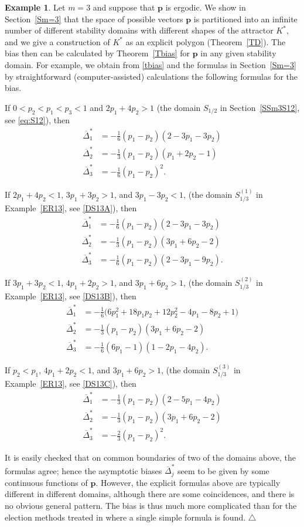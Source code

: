 \documentclass[11pt,reqno,tbtags,a4paper]{amsart}
\numberwithin{equation}{section}
\theoremstyle{plain}%
\theoremstyle{definition}
\newcommand\xqed[1]{%
    \leavevmode\unskip\penalty9999 \hbox{}\nobreak\hfill
    \quad\hbox{#1}}
\newtheorem{exampleqqq}[theorem]{Example}
\newenvironment{example}{\begin{exampleqqq}}
  {\xqed{$\triangle$}\end{exampleqqq}}
\theoremstyle{remark}
\newcommand{\refT}[1]{Theorem~\ref{#1}}
\newcommand{\refS}[1]{Section~\ref{#1}}
\newcommand{\refSS}[1]{Section~\ref{#1}}
\newcommand{\refE}[1]{Example~\ref{#1}}
\newcommand\bigpar[1]{\bigl(#1\bigr)}
\newcommand\gD{\Delta}
\newcommand\vp{\mathbf{p}}
\newcommand\bgDx{\overline{\gD}^*}
\newcommand\Kx{K^*}
\newcommand\SA{^{(1)}}
\newcommand\SB{^{(2)}}
\newcommand\SC{^{(3)}}
\newcommand\0{{\boldsymbol 0}}
\newcommand\1{{\boldsymbol 1}}
\begin{document}
\begin{example}\label{Ebias3}
  Let $m=3$ and suppose that $\vp$ is ergodic.
We show in \refS{Sm=3} 
that the space of possible vectors $\vp$ is partitioned into an infinite
number of different stability domains with different shapes of the
attractor $\Kx$, and we give a construction
of $\Kx$  as an explicit polygon (\refT{TD}).
The bias then can be calculated by \refT{Tbias} 
for $\vp$ in any given stability domain.
For example, we obtain from \eqref{tbias} and 
the formulas in \refS{Sm=3} by straightforward
(computer-assisted) calculations the following 
formulas for the bias.

If $0<p_2<p_1<p_3<1$ and $2p_1+4p_2>1$ 
(the domain $S_{1/2}$ in \refSS{SSm3S12}, see \eqref{eq:S12}), 
then 
\begin{align}
\bgDx_1&= -\tfrac16 (p_1-p_2)(2-3p_1-3p_2)
\\
\bgDx_2&= -\tfrac13(p_1-p_2)(p_1+2p_2-1)
\\
\bgDx_3&= -\tfrac16{(p_1-p_2)^2}
.\end{align}

If $2p_1+4p_2<1$,
$3p_1+3p_2>1$, 
and $3p_1-3p_2<1$,
(the domain $S_{1/3}\SA$ in \refE{ER13}, 
see \eqref{DS13A}),  
then 
\begin{align}
\bgDx_1&= -\tfrac16 (p_1-p_2)(2-3p_1-3p_2)
\\
\bgDx_2&= -\tfrac13(p_1-p_2)(3p_1+6p_2-2)
\\
\bgDx_3&= -\tfrac16{(p_1-p_2)(2-3p_1-9p_2)}
.\end{align}

If $3p_1+3p_2<1$,
$4p_1+2p_2>1$, 
and $3p_1+6p_2>1$,
(the domain $S_{1/3}\SB$ in \refE{ER13},
see \eqref{DS13B}),  
then 
\begin{align}
\bgDx_1&= -\tfrac16\bigpar{6p_1^{2}+18p_1p_2+12p_2^{2}-4p_1-8p_2+1}
\\
\bgDx_2&= -\tfrac13(p_1-p_2)(3p_1+6p_2-2)
\\
\bgDx_3&= -\tfrac16(6p_1-1)(1-2p_1-4p_2)
.\end{align}

If $p_2<p_1$,
$4p_1+2p_2<1$, 
and $3p_1+6p_2>1$,
(the domain $S_{1/3}\SC$ in \refE{ER13},
see \eqref{DS13C}),  
then 
\begin{align}
\bgDx_1&= -\tfrac13 (p_1-p_2)(2-5p_1-4p_2)
\\
\bgDx_2&= -\tfrac13(p_1-p_2)(3p_1+6p_2-2)
\\
\bgDx_3&= -\tfrac23{(p_1-p_2)^2}
.\end{align}

It is easily checked that
on common boundaries of two of the domains above, the formulas agree; 
hence the asymptotic biases $\bgDx_j$ seem to be given by
some continuous functions of $\vp$.
However, the explicit formulas above are typically different in different
domains, 
although there are some coincidences,
and there is no obvious general pattern. 
The bias is thus much more complicated than for the election methods treated
in \cite{SJ262} where a single simple formula is found.
\end{example}
\end{document}
